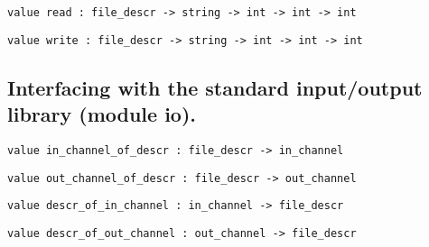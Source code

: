 %
\begin{comment}
 Close a file descriptor. 
\end{comment}
\begin{verbatim}
value read : file_descr -> string -> int -> int -> int
\end{verbatim}
%
\begin{comment}
 \verbread fd buff start len reads \verblen characters from descriptor
           \verbfd, storing them in string \verbbuff, starting at position \verbofs
           in string \verbbuff. Return the number of characters actually read. 
\end{comment}
\begin{verbatim}
value write : file_descr -> string -> int -> int -> int
\end{verbatim}
%
\begin{comment}
 \verbwrite fd buff start len writes \verblen characters to descriptor
           \verbfd, taking them from string \verbbuff, starting at position \verbofs
           in string \verbbuff. Return the number of characters actually
           written. 
\end{comment}
\subsection*{Interfacing with the standard input/output library (module io). }\begin{verbatim}
value in_channel_of_descr : file_descr -> in_channel
\end{verbatim}
%
\begin{comment}
 Create an input channel reading from the given descriptor. 
\end{comment}
\begin{verbatim}
value out_channel_of_descr : file_descr -> out_channel
\end{verbatim}
%
\begin{comment}
 Create an output channel writing on the given descriptor. 
\end{comment}
\begin{verbatim}
value descr_of_in_channel : in_channel -> file_descr
\end{verbatim}
%
\begin{comment}
 Return the descriptor corresponding to an input channel. 
\end{comment}
\begin{verbatim}
value descr_of_out_channel : out_channel -> file_descr
\end{verbatim}
%
\begin{comment}
 Return the descriptor corresponding to an output channel. 
\end{comment}
